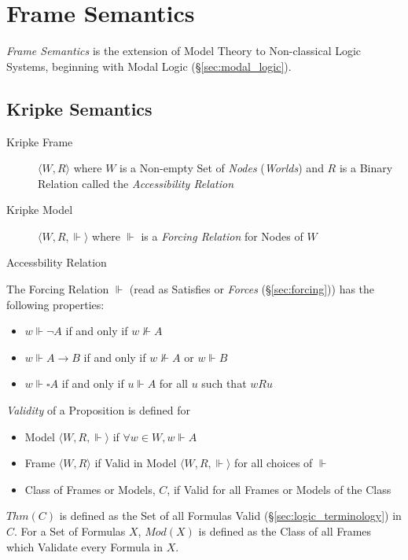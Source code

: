\section{Frame Semantics}\label{sec:frame_semantics}

\emph{Frame Semantics} is the extension of Model Theory to
Non-classical Logic Systems, beginning with Modal Logic
(\S\ref{sec:modal_logic}).

\subsection{Kripke Semantics}\label{sec:kripke_semantics}

\begin{description}
\item [Kripke Frame] $\langle W,R \rangle$ where $W$ is a Non-empty
  Set of \emph{Nodes} (\emph{Worlds}) and $R$ is a Binary Relation
  called the \emph{Accessibility Relation}
\item [Kripke Model] $\langle W,R,\Vdash \rangle$ where $\Vdash$ is a
  \emph{Forcing Relation} for Nodes of $W$
\end{description}
Accessbility Relation %

The Forcing Relation $\Vdash$ (read as Satisfies or \emph{Forces}
(\S\ref{sec:forcing})) has the following properties:
\begin{itemize}
\item $w \Vdash \neg A$ if and only if $w \nVdash A$
\item $w \Vdash A \rightarrow B$ if and only if $w \nVdash A$ or $w
  \Vdash B$
\item $w \Vdash \square A$ if and only if $u \Vdash A$ for all $u$
  such that $w R u$
\end{itemize}
\emph{Validity} of a Proposition is defined for
\begin{itemize}
\item Model $\langle W,R, \Vdash \rangle$ if $\forall w \in W,
  w \Vdash A$
\item Frame $\langle W,R \rangle$ if Valid in Model $\langle W,R,
  \Vdash \rangle$ for all choices of $\Vdash$
\item Class of Frames or Models, $C$, if Valid for all Frames or
  Models of the Class
\end{itemize}
$Thm(C)$ is defined as the Set of all Formulas Valid
(\S\ref{sec:logic_terminology}) in $C$. For a Set of Formulas $X$,
$Mod(X)$ is defined as the Class of all Frames which Validate every
Formula in $X$.

